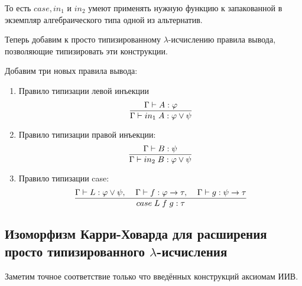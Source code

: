 То есть $case, in_1$ и $in_2$ умеют применять нужную функцию к запакованной в экземпляр алгебраического типа одной из альтернатив.

Теперь добавим к просто типизированному $\lambda$-исчислению правила вывода, позволяющие типизировать эти конструкции.

Добавим три новых правила вывода:

\begin{enumerate}
	\item Правило типизации левой инъекции
	\[
	\infer{\Gamma \vdash in_1 \; A: \varphi \vee \psi}{\Gamma\vdash A: \varphi}
	\]
	\item Правило типизации правой инъекции:
	\[
	\infer{\Gamma \vdash in_2 \; B: \varphi \vee \psi}{\Gamma\vdash B: \psi}
	\]
	
	\item Правило типизации case:
	\[
	\infer{case \; L \; f \; g : \tau}{\Gamma \vdash L: \varphi \vee \psi, \;\;\;\; \Gamma \vdash f : \varphi \to \tau, \;\;\;\; \Gamma \vdash g: \psi \to \tau}
	\]
\end{enumerate}

\subsection{Изоморфизм Карри-Ховарда для расширения просто типизированного $\lambda$-исчисления}

Заметим точное соответствие только что введённых конструкций аксиомам ИИВ.

